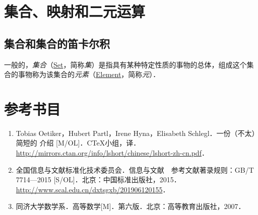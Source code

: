 \chapter{集合、映射和二元运算}

\section{集合和集合的笛卡尔积}

一般的，\emph{集合}（\href{http://mathworld.wolfram.com/Set.html}{Set}，简称\emph{集}）是指具有某种特定性质的事物的总体，组成这个集合的事物称为该集合的\emph{元素}（\href{http://mathworld.wolfram.com/Element.html}{Element}，简称\emph{元}）．



\appendix

\chapter{参考书目}

\begin{enumerate}
	\item Tobias Oetiker，Hubert Partl，Irene Hyna，Elisabeth Schlegl．一份（不太）简短的 \LaTeXe 介绍 [M/OL]．C\TeX 小组，译．\newline
	      \url{http://mirrors.ctan.org/info/lshort/chinese/lshort-zh-cn.pdf}．
	\item 全国信息与文献标准化技术委员会．信息与文献　参考文献著录规则：GB/T 7714—2015 [S/OL]．北京：中国标准出版社，2015．\newline
	      \url{http://www.scal.edu.cn/dxtsgxb/201906120155}．
	\item 同济大学数学系．高等数学[M]．第六版．北京：高等教育出版社，2007．
\end{enumerate}


